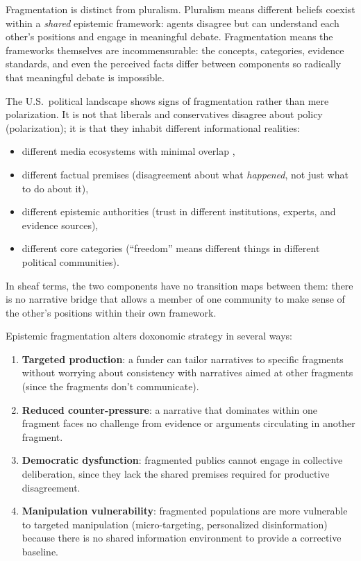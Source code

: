 Fragmentation is distinct from pluralism.
Pluralism means different beliefs coexist within a \emph{shared} epistemic framework: agents disagree but can understand each other's positions and engage in meaningful debate.
Fragmentation means the frameworks themselves are incommensurable: the concepts, categories, evidence standards, and even the perceived facts differ between components so radically that meaningful debate is impossible.

\begin{example}
\label{ex:fragmentation-politics}
The U.S.\ political landscape shows signs of fragmentation rather than mere polarization.
It is not that liberals and conservatives disagree about policy (polarization); it is that they inhabit different informational realities:
\begin{itemize}[nosep]
  \item different media ecosystems with minimal overlap \autocite{benkler2018},
  \item different factual premises (disagreement about what \emph{happened}, not just what to do about it),
  \item different epistemic authorities (trust in different institutions, experts, and evidence sources),
  \item different core categories (``freedom'' means different things in different political communities).
\end{itemize}
In sheaf terms, the two components have no transition maps between them: there is no narrative bridge that allows a member of one community to make sense of the other's positions within their own framework.
\end{example}

\begin{proposition}
\label{prop:fragmentation-strategy}
Epistemic fragmentation alters doxonomic strategy in several ways:
\begin{enumerate}[nosep]
  \item \textbf{Targeted production}: a funder can tailor narratives to specific fragments without worrying about consistency with narratives aimed at other fragments (since the fragments don't communicate).
  \item \textbf{Reduced counter-pressure}: a narrative that dominates within one fragment faces no challenge from evidence or arguments circulating in another fragment.
  \item \textbf{Democratic dysfunction}: fragmented publics cannot engage in collective deliberation, since they lack the shared premises required for productive disagreement.
  \item \textbf{Manipulation vulnerability}: fragmented populations are more vulnerable to targeted manipulation (micro-targeting, personalized disinformation) because there is no shared information environment to provide a corrective baseline.
\end{enumerate}
\end{proposition}


